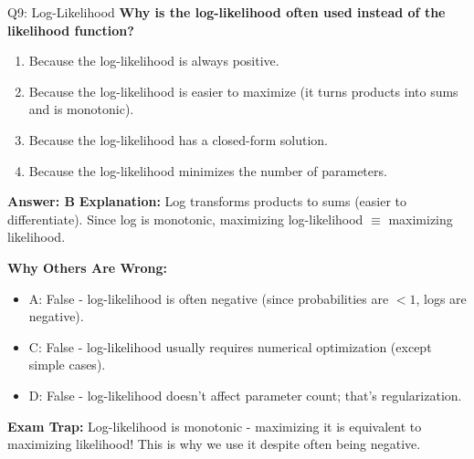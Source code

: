 \documentclass[8pt]{beamer}
\begin{document}
	\begin{frame}{Q9: Log-Likelihood}
		\fontsize{6.5}{7.5}\selectfont
		\textbf{Why is the log-likelihood often used instead of the likelihood function?}
		
		\begin{enumerate}
			\item Because the log-likelihood is always positive.
			\item Because the log-likelihood is easier to maximize (it turns products into sums and is monotonic).
			\item Because the log-likelihood has a closed-form solution.
			\item Because the log-likelihood minimizes the number of parameters.
		\end{enumerate}
		
		\vspace{0.05cm}
		\textcolor{myblue}{\textbf{Answer: B}}
		\vspace{0.05cm}
		\textcolor{myblue}{\textbf{Explanation:}} Log transforms products to sums (easier to differentiate). Since log is monotonic, maximizing log-likelihood $\equiv$ maximizing likelihood.
		
		\vspace{0.05cm}
		\textcolor{myred}{\textbf{Why Others Are Wrong:}}
		\begin{itemize}
			\item \textcolor{myred}{A:} False - log-likelihood is often negative (since probabilities are $<1$, logs are negative).
			\item \textcolor{myred}{C:} False - log-likelihood usually requires numerical optimization (except simple cases).
			\item \textcolor{myred}{D:} False - log-likelihood doesn't affect parameter count; that's regularization.
		\end{itemize}
		
		\textcolor{myred}{\textbf{Exam Trap:}} Log-likelihood is \textcolor{myblue}{monotonic} - maximizing it is equivalent to maximizing likelihood! This is why we use it despite often being negative.
	\end{frame}
	
\end{document}
